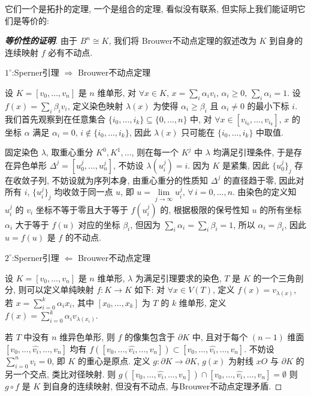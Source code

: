     它们一个是拓扑的定理, 一个是组合的定理, 看似没有联系, 但实际上我们能证明它们是等价的: 
    \begin{proof}[{\bf 等价性的证明}]
        由于 $B^n\cong K$, 我们将 Brouwer不动点定理的叙述改为 $K$ 到自身的连续映射 $f$ 必有不动点.

        $1^{\circ}$:Sperner引理 $\Rightarrow$ Brouwer不动点定理
        
        设 $K = [v_0,\dots,v_n]$ 是 $n$ 维单形, 对 $\forall x\in K$, $x=\sum_i\alpha_iv_i,\,\alpha_i\geqslant0,\,\sum_i\alpha_i=1$. 设 $f(x) = \sum_i\beta_iv_i$, 定义染色映射 
        $\lambda(x)$ 为使得 $\alpha_i\geqslant\beta_i$ 且 $\alpha_i\neq0$ 的最小下标 $i$. 我们首先观察到在任意集合 $\{i_0,\dots,i_k\}\subseteq\{0,\dots,n\}$ 中, 
        对 $\forall x\in[v_{i_0},\dots,v_{i_k}]$, $x$ 的坐标 $\alpha$ 满足 $\alpha_i=0,\,i\notin\{i_0,\dots,i_k\}$, 因此 $\lambda(x)$ 只可能在 $\{i_0,\dots,i_k\}$ 中取值.

        固定染色 $\lambda$, 取重心重分 $K^0,K^1,\dots$, 则在每一个 $K^j$ 中 $\lambda$ 均满足引理条件, 于是存在异色单形 $\Delta^j=[u^j_0,\dots,u^j_n]$, 不妨设 $\lambda(u^j_i)=i$.
        因为 $K$ 是紧集, 因此 $\{u^j_0\}_j$ 存在收敛子列, 不妨设就为序列本身, 由重心重分的性质知 $\Delta^j$ 的直径趋于零, 因此对所有 $i$, $\{u^j_i\}_j$ 均收敛于同一点 $u$, 即 
        $u=\lim\limits_{j\rightarrow\infty}u^j_i,\,\forall\,i=0,\dots,n$. 由染色的定义知 $u^j_i$ 的 $v_i$ 坐标不等于零且大于等于 $f(u^j_i)$ 的, 
        根据极限的保号性知 $u$ 的所有坐标 $\alpha_i$ 大于等于 $f(u)$ 对应的坐标 $\beta_i$, 但因为 $\sum_i\alpha_i = \sum_i\beta_i = 1$, 所以 $\alpha_i=\beta_i$, 因此 $u = f(u)$ 是 $f$ 的不动点.

        $2^{\circ}$:Sperner引理 $\Leftarrow$ Brouwer不动点定理
        
        设 $K = [v_0,\dots,v_n]$ 是 $n$ 维单形, $\lambda$ 为满足引理要求的染色, $T$ 是 $K$ 的一个三角剖分, 则可以定义单纯映射 $f:K\rightarrow K$ 如下: 对 $\forall x\in V(T)$, 
        定义 $f(x) = v_{\lambda(x)}$, 若 $x = \sum_{i=0}^{k}\alpha_ix_i$, 其中 $[x_0,\dots,x_k]$ 为 $T$ 的 $k$ 维单形, 定义 $f(x) = \sum_{i=0}^{k}\alpha_iv_{\lambda(x_i)}$.

        若 $T$ 中没有 $n$ 维异色单形, 则 $f$ 的像集包含于 $\partial K$ 中, 且对于每个 $(n-1)$ 维面 $[v_0,\dots,\hat{v_i},\dots,v_n]$ 均有 $f([v_0,\dots,\hat{v_i},\dots,v_n])\subset[v_0,\dots,\hat{v_i},\dots,v_n]$.
        不妨设 $\sum_{i=0}^{n}v_i = 0$, 即 $K$ 的重心是原点. 定义 $g:\partial K\rightarrow \partial K$, $g(x)$ 为射线 $xO$ 与 $\partial K$ 的另一个交点, 类比对径映射. 则 $g([v_0,\dots,\hat{v_i},\dots,v_n])\cap[v_0,\dots,\hat{v_i},\dots,v_n]=\emptyset$
        则 $g\circ f$ 是 $K$ 到自身的连续映射, 但没有不动点, 与Brouwer不动点定理矛盾.
    \end{proof}
    
